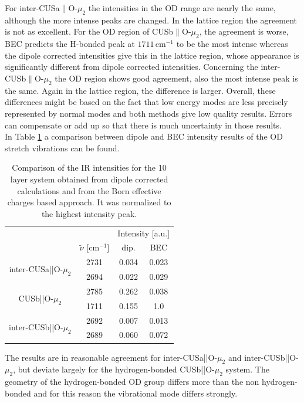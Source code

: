 \documentclass[11pt,DIV=13,BCOR=5mm,a4paper,headinclude]{scrbook}
\begin{document}
For inter-CUSa$\parallel$O-$\mu_2$ the intensities in the OD range are nearly the same, although the more intense peaks are changed.
In the lattice region the agreement is not as excellent.
For the OD region of CUSb$\parallel$O-$\mu_2$, the agreement is worse, BEC predicts the H-bonded peak at $1711\,$cm$^{-1}$ to be the most intense whereas the dipole corrected intensities give this in the lattice region, whose appearance is significantly different from dipole corrected intensities.
Concerning the inter-CUSb$\parallel$O-$\mu_2$ the OD region shows good agreement, also the most intense peak is the same.
Again in the lattice region, the difference is larger.
Overall, these differences might be based on the fact that low energy modes are less precisely represented by normal modes and both methods give low quality results.
Errors can compensate or add up so that there is much uncertainty in those results.
\\ 
In Table \ref{tab:freq_lowcov_comp} a comparison between dipole and BEC intensity results of the OD stretch vibrations can be found.
\begin{table}[!h]
\centering
\caption{Comparison of the IR intensities for the 10 layer system obtained from dipole corrected calculations and from the Born effective charges based approach.
It was normalized to the highest intensity peak.}
\begin{tabular}{cc|cc}
\toprule
&&\multicolumn{2}{c}{Intensity [a.u.]}\\
&$\tilde{\nu}$ [cm$^{-1}$]& dip. & BEC \\\midrule
\multirow{2}{3cm}{inter-CUSa||O-$ \mu_2$}&2731 &0.034 &0.023 \\
 &2694&0.022 &0.029 \\\hline
\multirow{2}{3cm}{CUSb||O-$ \mu_2$} & 2785&0.262 &0.038 \\
 & 1711& 0.155&1.0 \\\hline
\multirow{2}{3cm}{inter-CUSb||O-$ \mu_2$}& 2692& 0.007&0.013 \\
 & 2689& 0.060& 0.072\\\bottomrule
\end{tabular}
\label{tab:freq_lowcov_comp}
\end{table}
The results are in reasonable agreement for inter-CUSa||O-$ \mu_2$ and inter-CUSb||O-$ \mu_2$, but deviate largely for the hydrogen-bonded CUSb||O-$ \mu_2$ system.
The geometry of the hydrogen-bonded OD group differs more than the non hydrogen-bonded and for this reason the vibrational mode differs strongly.
\\
\end{document}
